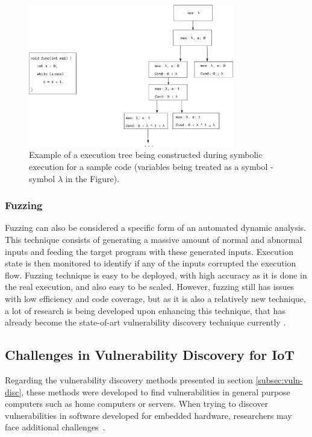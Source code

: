 \begin{figure}[H]
    \centering
    \includegraphics[width=0.8\textwidth]{figs/symbolicalle.eps}
    \caption{Example of a execution tree being constructed during symbolic execution for a sample code (variables being treated as a symbol  - symbol $\lambda$ in the Figure).}
    \label{fig:symbolic-execution}
\end{figure}


\subsubsection{Fuzzing}

Fuzzing can also be considered a specific form of an automated dynamic analysis. This technique consists of generating a massive amount of normal and abnormal inputs and feeding the target program with these generated inputs. Execution state is then monitored to identify if any of the inputs corrupted the execution flow. Fuzzing technique is easy to be deployed, with high accuracy as it is done in the real execution, and also easy to be scaled. However, fuzzing still has issues with low efficiency and code coverage, but as it is also a relatively new technique, a lot of research is being developed upon enhancing this technique, that has already become the state-of-art vulnerability discovery technique currently \cite{fuzzing}.


\subsection{Challenges in Vulnerability Discovery for IoT}

Regarding the vulnerability discovery methods presented in section \ref{subsec:vuln-disc}, these methods were developed to find vulnerabilities in general purpose computers such as home computers or servers. When trying to discover vulnerabilities in software developed for embedded hardware, researchers may face additional challenges~\cite{real-or-rehosted}.

